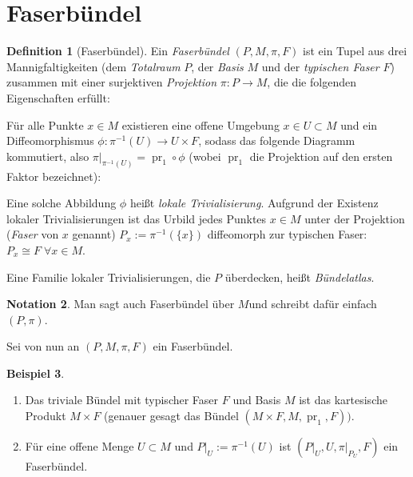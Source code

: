 \documentclass[a4paper]{scrreprt}
\numberwithin{equation}{chapter}
\DeclareMathOperator{\pr}{pr}
\theoremstyle{definition}
\newtheorem{defn}{Definition}[section]
\newtheorem{bsp}[defn]{Beispiel}
\newtheorem{nota}[defn]{Notation}
\begin{document}
	\section{Faserbündel}
		\begin{defn}[Faserbündel]
			Ein \emph{Faserbündel} $(P,M,\pi ,F)$ ist ein Tupel aus drei Mannigfaltigkeiten (dem \emph{Totalraum} $P$, der \emph{Basis} $M$ und der \emph{typischen Faser} $F$) zusammen mit einer surjektiven \emph{Projektion} $\pi\colon P\rightarrow M$, die die folgenden Eigenschaften erfüllt:

				Für alle Punkte $x\in M$ existieren eine offene Umgebung $x\in U\subset M$ und ein Diffeomorphismus $\phi\colon \pi^{-1}(U)\rightarrow U\times F$, sodass das folgende Diagramm kommutiert, also $\pi\vert_{\pi^{-1}(U)}=\pr_1\circ\phi$ (wobei $\pr_1$ die Projektion auf den ersten Faktor bezeichnet):
			\begin{center}
			\end{center}
			Eine solche Abbildung $\phi$ heißt \emph{lokale Trivialisierung}. Aufgrund der Existenz lokaler Trivialisierungen ist das Urbild jedes Punktes $x\in M$ unter der Projektion (\emph{Faser} von $x$ genannt) $P_x:=\pi^{-1}(\lbrace x\rbrace )$ diffeomorph zur typischen Faser: $P_x\cong F \; \forall x\in M$.

			Eine Familie lokaler Trivialisierungen, die $P$ überdecken, heißt \emph{Bündelatlas}.
		\end{defn}
		\begin{nota}
			Man sagt auch \glqq Faserbündel über $M$\grqq und schreibt dafür einfach $(P,\pi)$.
		\end{nota}
		Sei von nun an $(P,M,\pi ,F)$ ein Faserbündel.
		\begin{bsp}\hfill
			\begin{enumerate}
				\item Das triviale Bündel mit typischer Faser $F$ und Basis $M$ ist das kartesische Produkt $M\times F$ (genauer gesagt das Bündel $(M\times F,M,\pr_1,F))$.
				\item Für eine offene Menge $U\subset M$ und $P\vert_U:=\pi^{-1}(U)$ ist $(P\vert_U,U,\pi\vert_{P_U},F)$ ein Faserbündel.
			\end{enumerate}
		\end{bsp}
\end{document}
